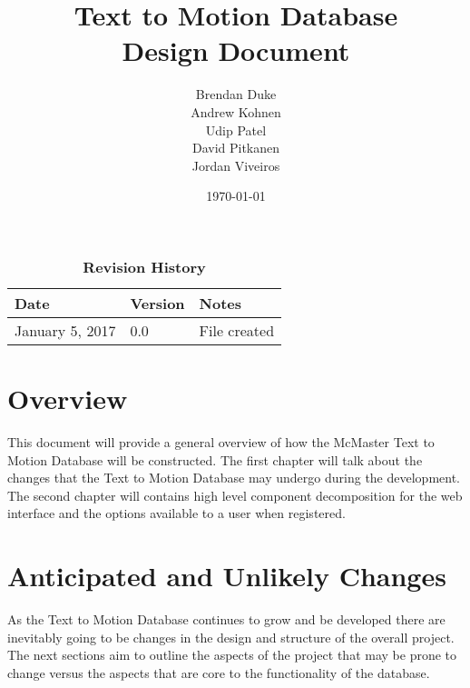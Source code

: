 \documentclass{scrreprt}
\begin{document}
\title{\bf Text to Motion Database\\[\baselineskip]\Large Design Document}
\author{Brendan Duke\\Andrew Kohnen\\Udip Patel\\David Pitkanen\\Jordan Viveiros}
\date{\today}

\maketitle

\tableofcontents


\begin{table}[bp]
\caption*{\bf Revision History}
\begin{tabularx}{\textwidth}{p{3.5cm}p{2cm}X}
\toprule {\bf Date} & {\bf Version} & {\bf Notes}\\
\midrule
January 5, 2017 & 0.0 & File created\\
\bottomrule
\end{tabularx}
\end{table}

\newpage


\chapter{Overview}
This document will provide a general overview of how the McMaster Text to Motion Database will be constructed. The first chapter will talk about the changes that the Text to Motion Database may undergo during the development. The second chapter will contains high level component decomposition for the web interface and the options available to a user when registered.

\chapter{Anticipated and Unlikely Changes}
As the Text to Motion Database continues to grow and be developed there are inevitably going to be changes in the design and structure of the overall project. The next sections aim to outline the aspects of the project that may be prone to change versus the aspects that are core to the functionality of the database.
\end{document}
